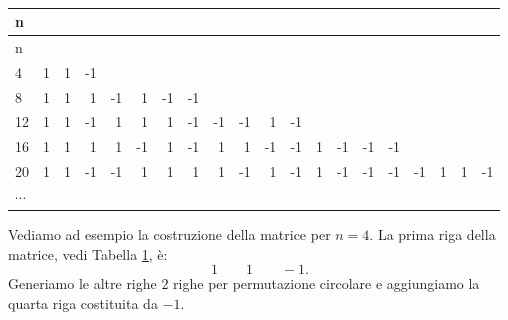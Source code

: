 \documentclass[
  11pt,
]{book}
\begin{document}
\begin{longtable}[]{@{}lrrrrrrrrrrrrrrrrrrr@{}}
\caption{\label{tab:PBAlg}}\tabularnewline
\toprule
n & & & & & & & & & & & & & & & & & & &\tabularnewline
\midrule
\endfirsthead
\toprule
n & & & & & & & & & & & & & & & & & & &\tabularnewline
\midrule
\endhead
4 & 1 & 1 & -1 & & & & & & & & & & & & & & & &\tabularnewline
8 & 1 & 1 & 1 & -1 & 1 & -1 & -1 & & & & & & & & & & & &\tabularnewline
12 & 1 & 1 & -1 & 1 & 1 & 1 & -1 & -1 & -1 & 1 & -1 & & & & & & & &\tabularnewline
16 & 1 & 1 & 1 & 1 & -1 & 1 & -1 & 1 & 1 & -1 & -1 & 1 & -1 & -1 & -1 & & & &\tabularnewline
20 & 1 & 1 & -1 & -1 & 1 & 1 & 1 & 1 & -1 & 1 & -1 & 1 & -1 & -1 & -1 & -1 & 1 & 1 & -1\tabularnewline
\(\cdots\) & & & & & & & & & & & & & & & & & & &\tabularnewline
\bottomrule
\end{longtable}

Vediamo ad esempio la costruzione della matrice per \(n=4.\) La prima riga della matrice, vedi Tabella \ref{tab:PBAlg}, è:\\
\begin{equation*}
    1 \qquad 1 \qquad -1.
\end{equation*}
Generiamo le altre righe \(2\) righe per permutazione circolare e aggiungiamo la quarta riga costituita da \(-1\).
\end{document}
